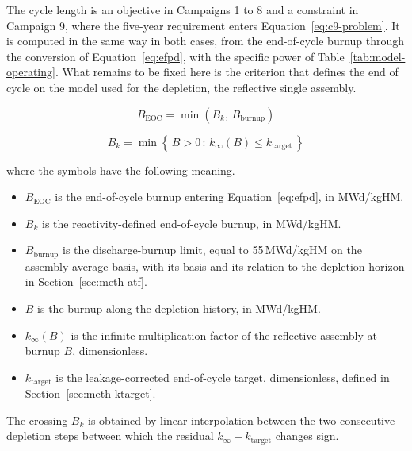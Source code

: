 The cycle length is an objective in Campaigns 1 to 8 and a constraint in
Campaign 9, where the five-year requirement enters
Equation~\eqref{eq:c9-problem}. It is computed in the same way in both
cases, from the end-of-cycle burnup through the conversion of
Equation~\eqref{eq:efpd}, with the specific power of
Table~\ref{tab:model-operating}. What remains to be fixed here is the
criterion that defines the end of cycle on the model used for the
depletion, the reflective single assembly.

\begin{equation}
B_\mathrm{EOC} = \min\!\left( B_k,\, B_\mathrm{burnup} \right)
\label{eq:eoc}
\end{equation}

\begin{equation}
B_k = \min\left\{\, B > 0 \,:\, k_\infty(B) \le k_\mathrm{target} \,\right\}
\label{eq:eoc-k}
\end{equation}

\noindent where the symbols have the following meaning.

\begin{itemize}
  \item $B_\mathrm{EOC}$ is the end-of-cycle burnup entering
        Equation~\eqref{eq:efpd}, in MWd/kgHM.

  \item $B_k$ is the reactivity-defined end-of-cycle burnup, in
        MWd/kgHM.

  \item $B_\mathrm{burnup}$ is the discharge-burnup limit, equal to
        55\,MWd/kgHM on the assembly-average basis, with its basis and
        its relation to the depletion horizon in
        Section~\ref{sec:meth-atf}.

  \item $B$ is the burnup along the depletion history, in MWd/kgHM.

  \item $k_\infty(B)$ is the infinite multiplication factor of the
        reflective assembly at burnup $B$, dimensionless.

  \item $k_\mathrm{target}$ is the leakage-corrected end-of-cycle
        target, dimensionless, defined in
        Section~\ref{sec:meth-ktarget}.
\end{itemize}

The crossing $B_k$ is obtained by linear interpolation between the two
consecutive depletion steps between which the residual
$k_\infty - k_\mathrm{target}$ changes sign.

